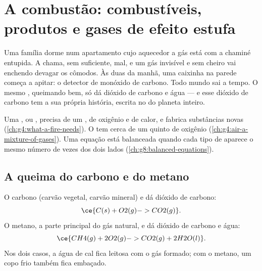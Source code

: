 \chapter{A combustão: combustíveis, produtos e gases de efeito estufa}\label{ch:g8:combustion-and-fuels}

Uma família dorme num apartamento cujo aquecedor a gás está com a
chaminé entupida. A chama, sem  suficiente,  mal, e um gás
invisível e sem cheiro vai enchendo devagar os cômodos. Às duas da
manhã, uma caixinha na parede começa a apitar: o detector de monóxido de
carbono. Todo mundo sai a tempo. O mesmo , queimando bem, só
dá dióxido de carbono e água --- e esse dióxido de carbono tem a sua
própria história, escrita no  do planeta inteiro.

\begin{recall}
Uma , ou , precisa de um , de oxigênio e de
calor, e fabrica substâncias novas (\cref{ch:g4:what-a-fire-needs}). O
 tem cerca de um quinto de oxigênio
(\cref{ch:g4:air-a-mixture-of-gases}). Uma equação está balanceada
quando cada tipo de  aparece o mesmo número de vezes dos dois lados
(\cref{ch:g8:balanced-equations}).
\end{recall}

\section{A queima do carbono e do metano}

\begin{example}\label{ex:g8:combustion-and-fuels:two}
O carbono (carvão vegetal, carvão mineral)  e dá dióxido de
carbono:
\[
  \ce{C(s) + O2(g) -> CO2(g)}.
\]
O metano, a parte principal do gás natural,  e dá dióxido de
carbono e água:
\[
  \ce{CH4(g) + 2O2(g) -> CO2(g) + 2H2O(l)}.
\]
Nos dois casos, a água de cal fica leitosa com o gás formado; com o
metano, um copo frio também fica embaçado.
\end{example}

